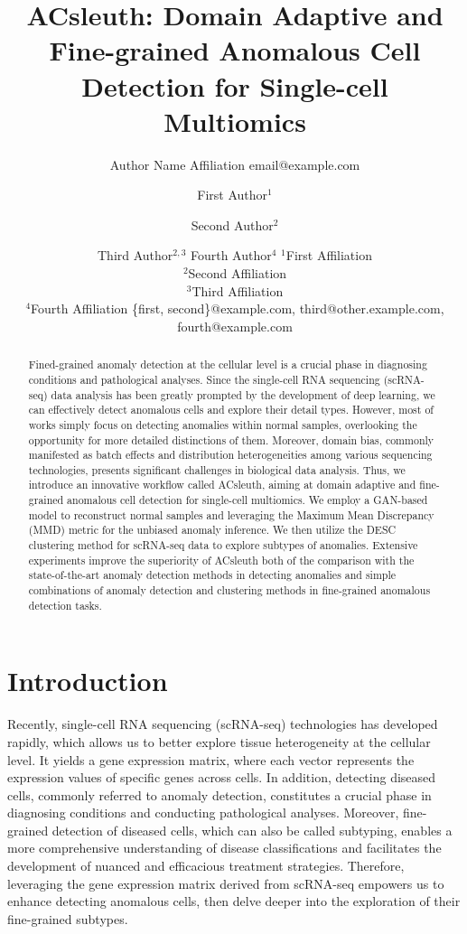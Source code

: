 \documentclass{article}
\title{ACsleuth: Domain Adaptive and Fine-grained Anomalous Cell Detection for Single-cell Multiomics}
\author{
    Author Name
    \affiliations
    Affiliation
    \emails
    email@example.com
}
\author{
First Author$^1$
\and
Second Author$^2$\and
Third Author$^{2,3}$\And
Fourth Author$^4$
\affiliations
$^1$First Affiliation\\
$^2$Second Affiliation\\
$^3$Third Affiliation\\
$^4$Fourth Affiliation
\emails
\{first, second\}@example.com,
third@other.example.com,
fourth@example.com
}
\begin{document}
\maketitle

\begin{abstract}
    Fined-grained anomaly detection at the cellular level is a crucial phase in diagnosing 
    conditions and pathological analyses. Since the single-cell RNA sequencing (scRNA-seq) 
    data analysis has been greatly prompted by the development of deep learning, we can 
    effectively detect anomalous cells and explore their detail types. However, most of 
    works simply focus on detecting anomalies within normal samples, overlooking the 
    opportunity for more detailed distinctions of them. Moreover, domain bias, commonly 
    manifested as batch effects and distribution heterogeneities among various sequencing technologies, 
    presents significant challenges in biological data analysis. Thus, we introduce an innovative workflow called ACsleuth, 
    aiming at domain adaptive and fine-grained anomalous cell detection for single-cell multiomics.
    We employ a GAN-based model to reconstruct normal samples and leveraging the Maximum Mean Discrepancy (MMD) 
    metric for the unbiased anomaly inference. We then utilize the DESC clustering method for 
    scRNA-seq data to explore subtypes of anomalies. Extensive experiments improve the superiority 
    of ACsleuth both of the comparison with the state-of-the-art anomaly detection methods in 
    detecting anomalies and simple combinations of anomaly detection and clustering methods in 
    fine-grained anomalous detection tasks.
\end{abstract}

\section{Introduction}

Recently, single-cell RNA sequencing (scRNA-seq) technologies has developed rapidly, 
which allows us to better explore tissue heterogeneity at the cellular level. It yields 
a gene expression matrix, where each vector represents the expression values of specific 
genes across cells. In addition, detecting diseased cells, commonly referred to anomaly 
detection, constitutes a crucial phase in diagnosing conditions and conducting pathological 
analyses. Moreover, fine-grained detection of diseased cells, which can also be called subtyping, enables a more comprehensive 
understanding of disease classifications and facilitates the development of nuanced and 
efficacious treatment strategies. Therefore, leveraging the gene expression matrix derived 
from scRNA-seq empowers us to enhance detecting anomalous cells, then delve deeper into 
the exploration of their fine-grained subtypes.
\end{document}
